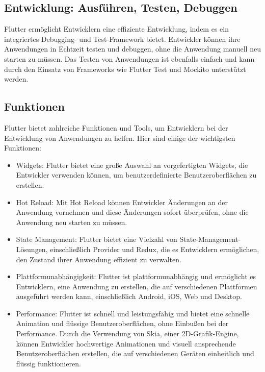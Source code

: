 \subsection{Entwicklung: Ausführen, Testen, Debuggen}

Flutter ermöglicht Entwicklern eine effiziente Entwicklung, indem es ein integriertes Debugging- und Test-Framework bietet. Entwickler können ihre Anwendungen in Echtzeit testen und debuggen, ohne die Anwendung manuell neu starten zu müssen. Das Testen von Anwendungen ist ebenfalls einfach und kann durch den Einsatz von Frameworks wie Flutter Test und Mockito unterstützt werden.

\subsection{Funktionen}

Flutter bietet zahlreiche Funktionen und Tools, um Entwicklern bei der Entwicklung von Anwendungen zu helfen. Hier sind einige der wichtigsten Funktionen:

\begin{itemize}
\item Widgets: Flutter bietet eine große Auswahl an vorgefertigten Widgets, die Entwickler verwenden können, um benutzerdefinierte Benutzeroberflächen zu erstellen.
\item Hot Reload: Mit Hot Reload können Entwickler Änderungen an der Anwendung vornehmen und diese Änderungen sofort überprüfen, ohne die Anwendung neu starten zu müssen.
\item State Management: Flutter bietet eine Vielzahl von State-Management-Lösungen, einschließlich Provider und Redux, die es Entwicklern ermöglichen, den Zustand ihrer Anwendung effizient zu verwalten.
\item Plattformunabhängigkeit: Flutter ist plattformunabhängig und ermöglicht es Entwicklern, eine Anwendung zu erstellen, die auf verschiedenen Plattformen ausgeführt werden kann, einschließlich Android, iOS, Web und Desktop.
\newpage
\item Performance: Flutter ist schnell und leistungsfähig und bietet eine schnelle Animation und flüssige Benutzeroberflächen, ohne Einbußen bei der Performance. Durch die Verwendung von Skia, einer 2D-Grafik-Engine, können Entwickler hochwertige Animationen und visuell ansprechende Benutzeroberflächen erstellen, die auf verschiedenen Geräten einheitlich und flüssig funktionieren.
\end{itemize}

